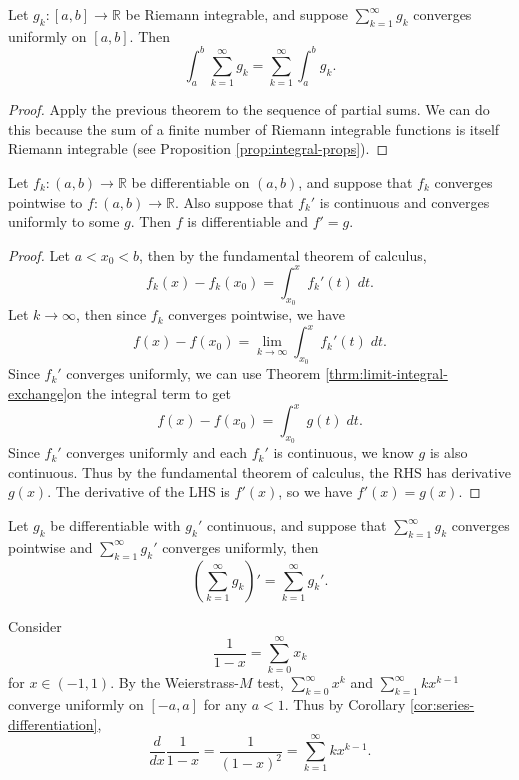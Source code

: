 \documentclass[10pt]{report}
\begin{document}
\begin{cor}
	Let $g_k : [a,b] \to \mathbb{R}$ be Riemann integrable, and suppose $\sum_{k=1}^{\infty} g_k$ converges uniformly on $[a,b]$. Then
	\[
		\int_{a}^{b} \sum_{k=1}^{\infty} g_k = \sum_{k=1}^{\infty} \int_{a}^{b} g_k.
	\] 
\end{cor}
\begin{proof}
	Apply the previous theorem to the sequence of partial sums. We can do this because the sum of a finite number of Riemann integrable functions is itself Riemann integrable (see Proposition \ref{prop:integral-props}).
\end{proof}

\begin{thrm}{}{}
	Let $f_k:(a,b) \to \mathbb{R}$ be differentiable on $(a,b)$, and suppose that $f_k$ converges pointwise to $f:(a,b) \to \mathbb{R}$. Also suppose that $f_k'$ is continuous and converges uniformly to some $g$. Then $f$ is differentiable and $f'=g$.
\end{thrm}
\begin{proof}
	Let $a<x_0<b$, then by the fundamental theorem of calculus,
	\[
		f_k(x) - f_k(x_0) = \int_{x_0}^{x} f_k'(t) \;dt.
	\] 
	Let $k \to \infty$, then since $f_k$ converges pointwise, we have
	\[
		f(x) - f(x_0) = \lim_{k \to \infty} \int_{x_0}^{x} f_k'(t)\;dt.
	\] 
	Since $f_k'$ converges uniformly, we can use Theorem \ref{thrm:limit-integral-exchange}on the integral term to get
	\[
		f(x) - f(x_0) = \int_{x_0}^{x} g(t)\;dt.
	\] 
	Since $f_k'$ converges uniformly and each  $f_k'$ is continuous, we know $g$ is also continuous. Thus by the fundamental theorem of calculus, the RHS has derivative $g(x)$. The derivative of the LHS is $f'(x)$, so we have $f'(x) = g(x)$.
\end{proof}

\begin{cor}
	\label{cor:series-differentiation}
	Let $g_k$ be differentiable with $g_k'$ continuous, and suppose that $\sum_{k=1}^{\infty} g_k$ converges pointwise and $\sum_{k=1}^{\infty} g_k'$ converges uniformly, then
	\[
		\left( \sum_{k=1}^{\infty} g_k \right)' = \sum_{k=1}^{\infty} g_k'.
	\] 
\end{cor}

\begin{ex}{}{}
	Consider \[ \frac{1}{1-x} = \sum_{k=0}^{\infty} x_k\] for $x \in (-1, 1)$. By the Weierstrass-$M$ test, $\sum_{k=0}^{\infty} x^k$ and $\sum_{k=1}^{\infty} k x^{k-1}$ converge uniformly on $[-a,a]$ for any $a <1$. Thus by Corollary \ref{cor:series-differentiation},
	\[
		\frac{d }{d x} \frac{1}{1-x} = \frac{1}{(1-x)^2} = \sum_{k=1}^{\infty} k x^{k-1}.
	\] 
\end{ex}
\end{document}
